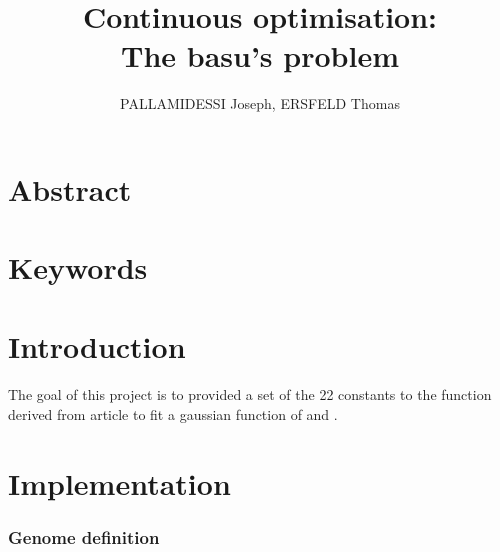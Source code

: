 \documentclass{article}
\begin{document}
  
  \title{Continuous optimisation: \\
    \large The basu's problem}
  \author{PALLAMIDESSI Joseph, ERSFELD Thomas}
  \maketitle
  
  \section{Abstract} %
  \label{sec:Abstract}
    \paragraph{} %
    \label{par:}
    

  \section{Keywords} %
  \label{sec:Keyword}
    \paragraph{} %
    \label{par:}
    
  
  \section{Introduction} %
  \label{sec:Intr}
    \paragraph{} %
    \label{par:}
    The goal of this project is to provided a set of the 22 constants to the
    function derived from article{\cite{} } to fit a gaussian function of  and
    .


  \section{Implementation} %
  \label{sec:Implementation}
    \subsubsection{Genome definition} %
    \label{ssub:Genome definition}
      
\end{document}
